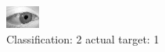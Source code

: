 \begin{figure}[h!]
\begin{center}
\includegraphics[width=0.60\columnwidth]{figures/ID2756_class_2_target_1.png}
\end{center}
\caption{ Classification: 2 actual target: 1}
\label{fig:ID2756_class_2_target_1}
\end{figure}
